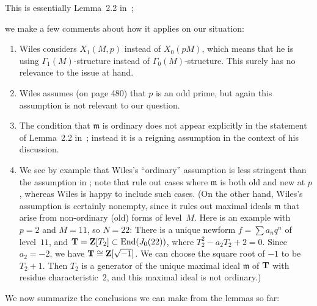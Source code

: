 \documentclass[10pt,twoside]{article}
\newcommand{\Z}{{\bf{Z}}}
\newcommand{\F}{{\bf{F}}}
\newcommand{\T}{{\bf{T}}}
\newcommand{\m}{{\mathfrak{m}}}
\newcommand{\End}{{\rm End}}
\newcommand{\isom}{\cong}
\renewcommand{\H}{\HHH}
\newcommand{\comment}[1]{}
\theoremstyle{definition}
\DeclareMathOperator{\HHH}{H}
\begin{document}
This is essentially Lemma~2.2 in~\cite[pg.~485]{wiles};
\comment{, which
proves, under a suitable hypothesis, that $\H^0(X_0(pM)_{\F_p},\Omega)[\m]$
is $1$-dimensional if $\m$ is a maximal ideal of~$\T$ that divides~$p$.
The ``suitable hypothesis'' is that $\m$ is ordinary, in the sense that
$T_p \not\in\m$.  (Note that $T_p$ is often denoted $U_p$ in this context.)
It follows from Wiles's lemma that $\T'=\T$ locally at~$\m$ whenever
$\m$ is an ordinary prime whose residue characteristic exactly
divides the level (which is $pM$ here).
}
we make a few comments about how it applies on our situation:
\begin{enumerate}
\item 
Wiles considers $X_1(M,p)$ instead of $X_0(pM)$, which means that he is
using $\Gamma_1(M)$-structure instead of $\Gamma_0(M)$-structure.
This surely has no relevance to the issue at hand.  

\item Wiles assumes (on page 480) that $p$ is an odd prime, but again
this assumption is not relevant to our question.  

\item 
The condition that $\m$ is ordinary does not appear
explicitly in the statement of Lemma~2.2 in~\cite{wiles}; 
instead it is a reigning
assumption in the context of his discussion.  

\item We see by example that Wiles's ``ordinary'' assumption is less
  stringent than the assumption in \cite{mazur-ribet}; note that
  \cite{mazur-ribet} rule out cases where $\m$ is both old and new at
  $p$, whereas Wiles is happy to include such cases.  (On the other
  hand, Wiles's assumption is certainly nonempty, since it rules out
  maximal ideals $\m$ that arise from non-ordinary (old) forms of
  level~$M$.  Here is an example with $p=2$ and $M=11$, so $N=22$:
  There is a unique newform $f=\sum a_n q^n$ of level~$11$, and
  $\T=\Z[T_2] \subset \End(J_0(22))$, where $T_2^2-a_2 T_2 + 2 =0$.
  Since $a_2=-2$, we have $\T\isom \Z[\sqrt{-1}]$.  We can choose the
  square root of $-1$ to be $T_2+1$.  Then $T_2$ is a generator of the
  unique maximal ideal $\m$ of $\T$ with residue characteristic~$2$,
  and this maximal ideal is not ordinary.)
\end{enumerate}

We now summarize the conclusions we can make from the lemmas so far:
\end{document}
